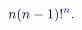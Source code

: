 \documentclass[12pt]{article}
\begin{document}
\makeatletter
\renewcommand*{\@textcolor}[3]{%
  \protect\leavevmode
  \begingroup
    \color#1{#2}#3%
  \endgroup
}
\makeatother
\begin{displaymath}
\mathcolor[RGB]{0,0,15}{n} \mathcolor[RGB]{0,0,30}{(} \mathcolor[RGB]{0,0,45}{n} \mathcolor[RGB]{0,0,60}{-} \mathcolor[RGB]{0,0,75}{1} \mathcolor[RGB]{0,0,90}{)} \mathcolor[RGB]{0,0,105}{!} ^ { \mathcolor[RGB]{0,0,120}{n} } \mathcolor[RGB]{0,0,135}{.}
\end{displaymath}
\end{document}
